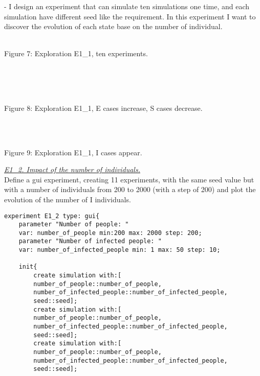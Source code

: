 \documentclass{article}
\begin{document}
\newline\newline
\begin{doc}
- I design an experiment that can simulate ten simulations one time, and each simulation have different seed like the requirement. In this experiment I want to discover the evolution of each state base on the number of individual.
\end{doc}
\newpage
\begin{pic7}
\\
\caption{Figure 7: Exploration E1\_1, ten experiments.}
\end{pic7}
\\\\
\begin{pic8}
\\
\caption{Figure 8: Exploration E1\_1, E cases increase, S cases decrease.}
\end{pic8}
\\
\begin{pic9}
\\
\caption{Figure 9: Exploration E1\_1, I cases appear.}
\end{pic9}
\newline\newline
\underline{\textit{E1\_2. Impact of the number of individuals.}}
\\
Define a gui experiment, creating 11 experiments, with the same seed value but with a number of individuals from 200 to 2000 (with a step of 200) and plot the evolution of the number of I individuals.
\newline\newline
\begin{tcolorbox}
\begin{lstlisting}
experiment E1_2 type: gui{
	parameter "Number of people: " 
	var: number_of_people min:200 max: 2000 step: 200;
	parameter "Number of infected people: " 
	var: number_of_infected_people min: 1 max: 50 step: 10;
	
	init{
		create simulation with:[
		number_of_people::number_of_people,
		number_of_infected_people::number_of_infected_people,
		seed::seed];
		create simulation with:[
		number_of_people::number_of_people,
		number_of_infected_people::number_of_infected_people,
		seed::seed];
		create simulation with:[
		number_of_people::number_of_people,
		number_of_infected_people::number_of_infected_people,
		seed::seed];
		
		
\end{lstlisting}
\end{tcolorbox}
\end{document}
